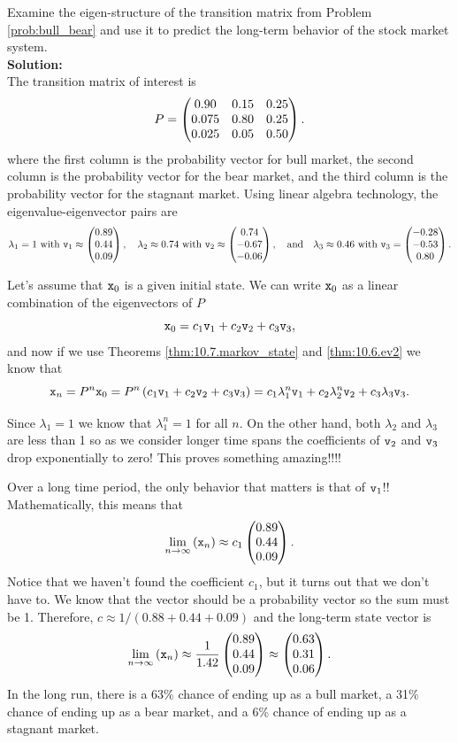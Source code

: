 \begin{example}
Examine the eigen-structure of the transition matrix from Problem \ref{prob:bull_bear}
and use it to predict the long-term behavior of the stock market system.
\\{\bf Solution:}\\
The transition matrix of interest is 
\[ P = \begin{pmatrix} 0.90 & 0.15 & 0.25 \\ 0.075 & 0.80 & 0.25 \\ 0.025 & 0.05 & 0.50 \end{pmatrix}. \]
where the first column is the probability vector for bull market, the second column is the
probability vector for the bear market, and the third column is the probability vector for
the stagnant market.  Using linear algebra technology, the eigenvalue-eigenvector pairs
are
\[ \lambda_1 = 1 \text{ with } \texttt{v}_1 \approx \begin{pmatrix} 0.89 \\ 0.44 \\ 0.09 \end{pmatrix}, \quad \lambda_2
    \approx 0.74 \text{ with } \texttt{v}_2 \approx \begin{pmatrix} 0.74 \\ -0.67 \\ -0.06 \end{pmatrix}, \quad
    \text{and} \quad \lambda_3 \approx 0.46 \text{ with } \texttt{v}_3 = \begin{pmatrix} -0.28 \\ -0.53 \\
    0.80 \end{pmatrix}. \]

Let's assume that $\texttt{x}_0$ is a given initial state.  We can write $\texttt{x}_0$ as a linear
combination of the eigenvectors of $P$
\[ \texttt{x}_0 = c_1 \texttt{v}_1 + c_2 \texttt{v}_2 + c_3 \texttt{v}_3, \]
and now if we use Theorems \ref{thm:10.7.markov_state} and \ref{thm:10.6.ev2} we know that 
\[ \texttt{x}_n = P^n \texttt{x}_0 = P^n \left( c_1 \texttt{v}_1 + c_2 \texttt{v}_2 + c_3 \texttt{v}_3 \right) = c_1
    \lambda_1^n \texttt{v}_1 + c_2 \lambda_2^n \texttt{v}_2 + c_3 \lambda_3 \texttt{v}_3. \]

Since $\lambda_1=1$ we know that $\lambda_1^n = 1$ for all $n$.  On the other hand, both
$\lambda_2$ and $\lambda_3$ are less than 1 so as we consider longer time spans the
coefficients of $\texttt{v}_2$ and $\texttt{v}_3$ drop exponentially to zero!  This proves something
amazing!!!!

Over a long time period, the only behavior that matters is that of $\texttt{v}_1$!!
Mathematically, this means that 
\[ \lim_{n \to \infty} \left( \texttt{x}_n \right) \approx c_1 \begin{pmatrix} 0.89 \\ 0.44 \\ 0.09 \end{pmatrix}. \]
Notice that we haven't found the coefficient $c_1$, but it turns out that we don't have
to.  We know that the vector should be a probability vector so the sum must be 1.
Therefore, $c \approx 1/(0.88 + 0.44+0.09)$ and the long-term state vector is
\[ \lim_{n \to \infty} \left( \texttt{x}_n \right) \approx \frac{1}{1.42} \begin{pmatrix} 0.89 \\ 0.44 \\
    0.09 \end{pmatrix}\approx \begin{pmatrix} 0.63 \\ 0.31 \\ 0.06 \end{pmatrix}. \]
In the long run, there is a 63\% chance of ending up as a bull market, a 31\% chance of
ending up as a bear market, and a 6\% chance of ending up as a stagnant market.
\end{example}

